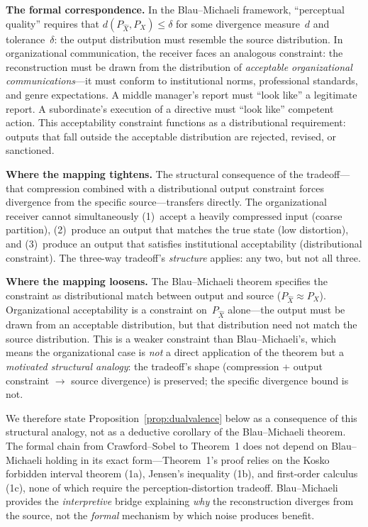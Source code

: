 \documentclass[12pt,letterpaper]{article}
\theoremstyle{definition}
\theoremstyle{remark}
\begin{document}
\textbf{The formal correspondence.} In the Blau--Michaeli framework, ``perceptual quality'' requires that $d(P_{\hat{X}}, P_X) \leq \delta$ for some divergence measure~$d$ and tolerance~$\delta$: the output distribution must resemble the source distribution. In organizational communication, the receiver faces an analogous constraint: the reconstruction must be drawn from the distribution of \emph{acceptable organizational communications}---it must conform to institutional norms, professional standards, and genre expectations. A middle manager's report must ``look like'' a legitimate report. A subordinate's execution of a directive must ``look like'' competent action. This acceptability constraint functions as a distributional requirement: outputs that fall outside the acceptable distribution are rejected, revised, or sanctioned.

\textbf{Where the mapping tightens.} The structural consequence of the tradeoff---that compression combined with a distributional output constraint forces divergence from the specific source---transfers directly. The organizational receiver cannot simultaneously (1)~accept a heavily compressed input (coarse partition), (2)~produce an output that matches the true state (low distortion), and (3)~produce an output that satisfies institutional acceptability (distributional constraint). The three-way tradeoff's \emph{structure} applies: any two, but not all three.

\textbf{Where the mapping loosens.} The Blau--Michaeli theorem specifies the constraint as distributional match between output and source ($P_{\hat{X}} \approx P_X$). Organizational acceptability is a constraint on~$P_{\hat{X}}$ alone---the output must be drawn from an acceptable distribution, but that distribution need not match the source distribution. This is a weaker constraint than Blau--Michaeli's, which means the organizational case is \emph{not} a direct application of the theorem but a \emph{motivated structural analogy}: the tradeoff's shape (compression + output constraint $\to$ source divergence) is preserved; the specific divergence bound is not.

We therefore state Proposition~\ref{prop:dualvalence} below as a consequence of this structural analogy, not as a deductive corollary of the Blau--Michaeli theorem. The formal chain from Crawford--Sobel to Theorem~1 does not depend on Blau--Michaeli holding in its exact form---Theorem~1's proof relies on the Kosko forbidden interval theorem (1a), Jensen's inequality (1b), and first-order calculus (1c), none of which require the perception-distortion tradeoff. Blau--Michaeli provides the \emph{interpretive} bridge explaining \emph{why} the reconstruction diverges from the source, not the \emph{formal} mechanism by which noise produces benefit.
\end{document}
